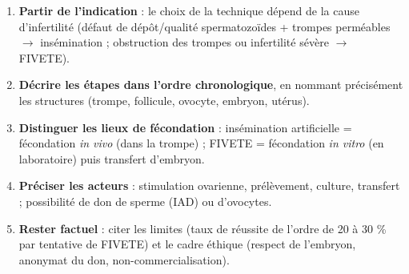 \documentclass[11pt]{article}
\begin{document}
\begin{methode}
\begin{enumerate}
\item \textbf{Partir de l'indication} : le choix de la technique dépend de la cause d'infertilité (défaut de dépôt/qualité spermatozoïdes + trompes perméables $\rightarrow$ insémination ; obstruction des trompes ou infertilité sévère $\rightarrow$ FIVETE).
\item \textbf{Décrire les étapes dans l'ordre chronologique}, en nommant précisément les structures (trompe, follicule, ovocyte, embryon, utérus).
\item \textbf{Distinguer les lieux de fécondation} : insémination artificielle = fécondation \emph{in vivo} (dans la trompe) ; FIVETE = fécondation \emph{in vitro} (en laboratoire) puis transfert d'embryon.
\item \textbf{Préciser les acteurs} : stimulation ovarienne, prélèvement, culture, transfert ; possibilité de don de sperme (IAD) ou d'ovocytes.
\item \textbf{Rester factuel} : citer les limites (taux de réussite de l'ordre de 20 à 30 \% par tentative de FIVETE) et le cadre éthique (respect de l'embryon, anonymat du don, non-commercialisation).
\end{enumerate}
\end{methode}
\end{document}
